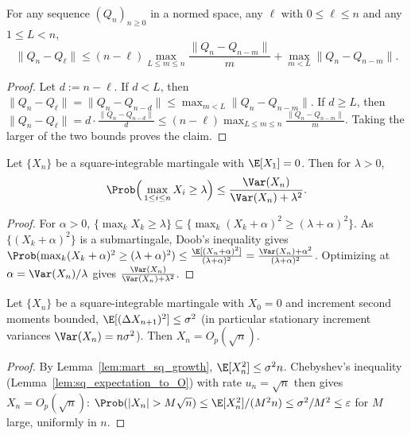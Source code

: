 \begin{lemma}\label{lem:increment_control}
\leanok
For any sequence $(Q_n)_{n\ge0}$ in a normed space, any $\ell$ with
$0 \le \ell \le n$ and any $1 \le L < n$,
\[
  \|Q_n - Q_\ell\| \le (n - \ell)\max_{L \le m \le n}\frac{\|Q_n - Q_{n-m}\|}{m}
   + \max_{m < L}\|Q_n - Q_{n-m}\|.
\]
\end{lemma}

\begin{proof}\leanok
Let $d := n - \ell$. If $d < L$, then $\|Q_n - Q_\ell\| = \|Q_n - Q_{n-d}\| \le
\max_{m<L}\|Q_n-Q_{n-m}\|$. If $d \ge L$, then
$\|Q_n - Q_\ell\| = d\cdot \frac{\|Q_n-Q_{n-d}\|}{d}
 \le (n-\ell)\max_{L\le m\le n}\frac{\|Q_n-Q_{n-m}\|}{m}$.
Taking the larger of the two bounds proves the claim.
\end{proof}

\begin{lemma}\label{lem:chebyshev_mart}
Let $\{X_n\}$ be a square-integrable martingale with $\E[X_1] = 0$. Then for
$\lambda > 0$,
\[
  \Prob\Big(\max_{1\le i\le n} X_i \ge \lambda\Big)
  \le \frac{\Var(X_n)}{\Var(X_n) + \lambda^2}.
\]
\end{lemma}

\begin{proof}
For $\alpha > 0$, $\{\max_k X_k \ge \lambda\} \subseteq
\{\max_k (X_k+\alpha)^2 \ge (\lambda+\alpha)^2\}$. As $\{(X_k+\alpha)^2\}$ is a
submartingale, Doob's inequality gives
$\Prob(\max_k(X_k+\alpha)^2 \ge (\lambda+\alpha)^2)
 \le \frac{\E[(X_n+\alpha)^2]}{(\lambda+\alpha)^2}
 = \frac{\Var(X_n)+\alpha^2}{(\lambda+\alpha)^2}$.
Optimizing at $\alpha = \Var(X_n)/\lambda$ gives
$\frac{\Var(X_n)}{\Var(X_n)+\lambda^2}$.
\end{proof}

\begin{corollary}\label{cor:mart_Op}
\leanok
{}
Let $\{X_n\}$ be a square-integrable martingale with $X_0 = 0$ and increment
second moments bounded, $\E[(\Delta X_{n+1})^2] \le \sigma^2$ (in particular
stationary increment variances $\Var(X_n) = n\sigma^2$). Then $X_n = O_p(\sqrt n)$.
\end{corollary}

\begin{proof}\leanok
{}
By Lemma~\ref{lem:mart_sq_growth}, $\E[X_n^2] \le \sigma^2 n$. Chebyshev's
inequality (Lemma~\ref{lem:sq_expectation_to_O}) with rate $u_n = \sqrt n$ then
gives $X_n = O_p(\sqrt n)$: $\Prob(|X_n| > M\sqrt n) \le \E[X_n^2]/(M^2 n)
\le \sigma^2/M^2 \le \varepsilon$ for $M$ large, uniformly in $n$.
\end{proof}

